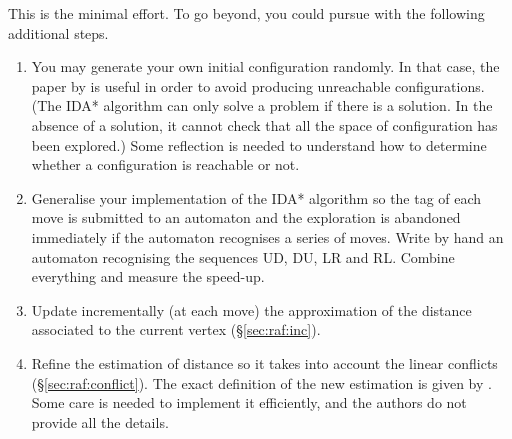 \documentclass[11pt,a4paper]{article}
\begin{document}
This is the minimal effort. To go beyond, you could pursue with the
following additional steps.
\begin{enumerate}

\item You may generate your own initial configuration randomly. In
  that case, the paper by \cite{archer-99} is useful in order to avoid
  producing unreachable configurations. (The IDA* algorithm can only
  solve a problem if there is a solution. In the absence of a
  solution, it cannot check that all the space of configuration has
  been explored.) Some reflection is needed to understand how to
  determine whether a configuration is reachable or not.

\item Generalise your implementation of the IDA* algorithm so the tag
  of each move is submitted to an automaton and the exploration is
  abandoned immediately if the automaton recognises a series of
  moves. Write by hand an automaton recognising the sequences UD, DU,
  LR and RL. Combine everything and measure the speed\hyp{}up.

\item Update incrementally (at each move) the approximation of the
  distance associated to the current vertex (\S\ref{sec:raf:inc}).

\item Refine the estimation of distance so it takes into account the
  linear conflicts (\S\ref{sec:raf:conflict}). The exact definition of
  the new estimation is given by \cite{hansson-92}. Some care is
  needed to implement it efficiently, and the authors do not provide
  all the details.

\end{enumerate}


\nocite*{}
\end{document}
